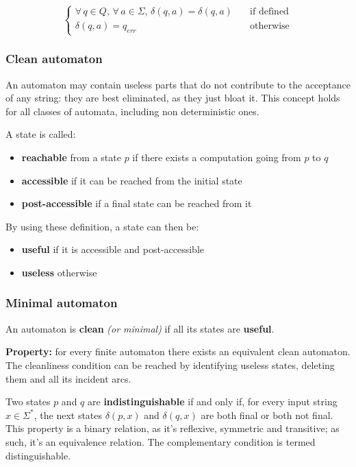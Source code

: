 \documentclass[english]{article}
\begin{document}
\[\begin{cases}
    \forall \, q \in Q, \, \forall \, a \in \Sigma, \, \delta(q, a) = \delta(q, a) \quad & \text{if defined} \\
    \delta(q, a)= q_\textit{err} \quad                                                   & \text{otherwise}
  \end{cases}\]

\subsubsection{Clean automaton}

An automaton may contain useless parts that do not contribute to the acceptance of any string: they are best eliminated, as they just bloat it.
This concept holds for all classes of automata, including non deterministic ones.

A state is called:
\begin{itemize}
  \item \textbf{reachable} from a state \(p\) if there exists a computation going from \(p\) to \(q\)
  \item \textbf{accessible} if it can be reached from the initial state
  \item \textbf{post-accessible} if a final state can be reached from it
\end{itemize}

By using these definition, a state can then be:
\begin{itemize}
  \item \textbf{useful} if it is accessible and post-accessible
  \item \textbf{useless} otherwise
\end{itemize}

\subsubsection{Minimal automaton}
An automaton is \textbf{clean} \textit{(or minimal)} if all its states are \textbf{useful}.

\textbf{Property:}
for every finite automaton there exists an equivalent clean automaton.
The cleanliness condition can be reached by identifying useless states, deleting them and all its incident arcs.

Two states \(p\) and \(q\) are \textbf{indistinguishable} if and only if, for every input string \(x \in \Sigma^\ast\), the next states \(\delta(p, x)\) and \(\delta(q, x)\) are both final or both not final.
This property is a binary relation, as it's reflexive, symmetric and transitive; as such, it's an equivalence relation.
The complementary condition is termed distinguishable.
\end{document}
